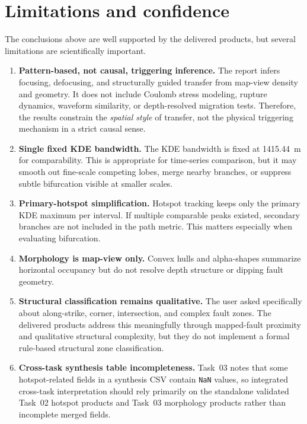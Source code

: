 \documentclass[11pt]{article}
\begin{document}
\section{Limitations and confidence}
The conclusions above are well supported by the delivered products, but several limitations are scientifically important.

\begin{enumerate}[leftmargin=*]
    \item \textbf{Pattern-based, not causal, triggering inference.} The report infers focusing, defocusing, and structurally guided transfer from map-view density and geometry. It does not include Coulomb stress modeling, rupture dynamics, waveform similarity, or depth-resolved migration tests. Therefore, the results constrain the \emph{spatial style} of transfer, not the physical triggering mechanism in a strict causal sense.
    \item \textbf{Single fixed KDE bandwidth.} The KDE bandwidth is fixed at 1415.44~m for comparability. This is appropriate for time-series comparison, but it may smooth out fine-scale competing lobes, merge nearby branches, or suppress subtle bifurcation visible at smaller scales.
    \item \textbf{Primary-hotspot simplification.} Hotspot tracking keeps only the primary KDE maximum per interval. If multiple comparable peaks existed, secondary branches are not included in the path metric. This matters especially when evaluating bifurcation.
    \item \textbf{Morphology is map-view only.} Convex hulls and alpha-shapes summarize horizontal occupancy but do not resolve depth structure or dipping fault geometry.
    \item \textbf{Structural classification remains qualitative.} The user asked specifically about along-strike, corner, intersection, and complex fault zones. The delivered products address this meaningfully through mapped-fault proximity and qualitative structural complexity, but they do not implement a formal rule-based structural zone classification.
    \item \textbf{Cross-task synthesis table incompleteness.} Task~03 notes that some hotspot-related fields in a synthesis CSV contain \texttt{NaN} values, so integrated cross-task interpretation should rely primarily on the standalone validated Task~02 hotspot products and Task~03 morphology products rather than incomplete merged fields.
\end{enumerate}
\end{document}
